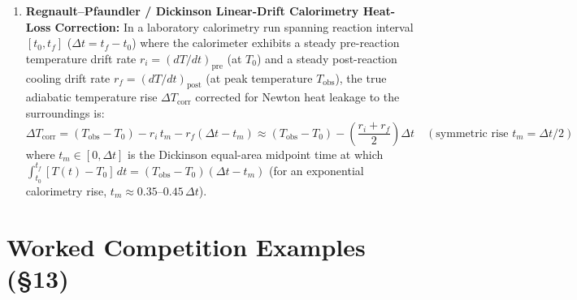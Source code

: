 \begin{enumerate}
\begin{equation}
    \Theta_{\mathrm{center}}(t) = \frac{T_{\mathrm{center}}(t) - T_\infty}{T_i - T_\infty} \approx A_1 \exp\!\left(-\lambda_1^2\,\mathrm{Fo}\right), \qquad \Theta_{\mathrm{surf}}(t) = \Theta_{\mathrm{center}}(t)\cdot \phi_1(\lambda_1)
    \label{eq:13:one-term-heisler}
  \end{equation}
  For $\mathrm{Bi} \ll 1$, $\lambda_1^2 \approx \mathrm{Bi}$ (slab), $2\mathrm{Bi}$ (cylinder), or $3\mathrm{Bi}$ (sphere) and $A_1 \to 1$, recovering lumped capacitance $\lambda_1^2\mathrm{Fo} = (hL_c/k)(\alpha t/L_c^2) = t/\tau$!
  \item \textbf{Regnault--Pfaundler / Dickinson Linear-Drift Calorimetry Heat-Loss Correction:}
  In a laboratory calorimetry run spanning reaction interval $[t_0, t_f]$ ($\Delta t = t_f - t_0$) where the calorimeter exhibits a steady pre-reaction temperature drift rate $r_i = (dT/dt)_{\mathrm{pre}}$ (at $T_0$) and a steady post-reaction cooling drift rate $r_f = (dT/dt)_{\mathrm{post}}$ (at peak temperature $T_{\mathrm{obs}}$), the true adiabatic temperature rise $\Delta T_{\mathrm{corr}}$ corrected for Newton heat leakage to the surroundings is:
  \begin{equation}
    \boxed{\Delta T_{\mathrm{corr}} = \left(T_{\mathrm{obs}} - T_0\right) - r_i\,t_m - r_f\left(\Delta t - t_m\right) \approx \left(T_{\mathrm{obs}} - T_0\right) - \left(\frac{r_i + r_f}{2}\right)\Delta t\quad (\text{symmetric rise } t_m = \Delta t/2)}
    \label{eq:13:regnault-pfaundler}
  \end{equation}
  where $t_m \in [0, \Delta t]$ is the Dickinson equal-area midpoint time at which $\int_{t_0}^{t_f}[T(t) - T_0]\,dt = (T_{\mathrm{obs}} - T_0)(\Delta t - t_m)$ (for an exponential calorimetry rise, $t_m \approx 0.35\text{--}0.45\,\Delta t$).
\end{enumerate}

\section{Worked Competition Examples (§13)}
\label{sec:13.4}

